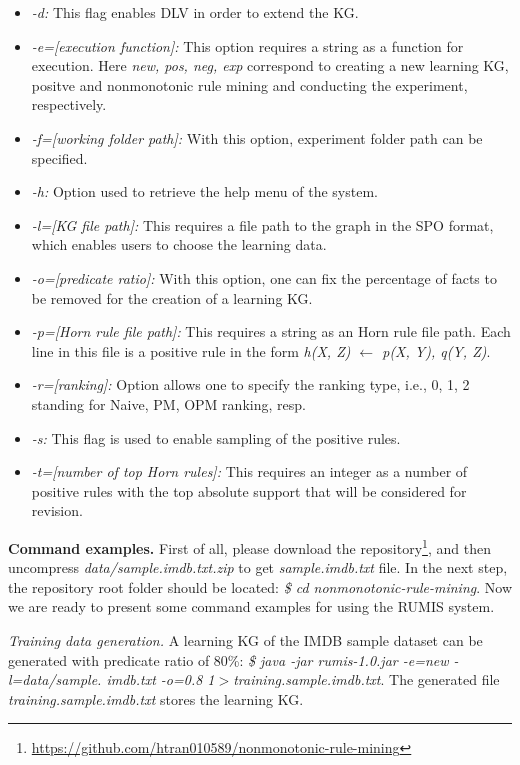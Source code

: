 \begin{itemize}
\item \textit{-d:} This flag enables DLV in order to extend the KG.
\item \textit{-e=[execution function]:} This option requires a string as a function for execution. Here \textit{new, pos, neg, exp} correspond to creating a new learning KG, positve and nonmonotonic rule mining and conducting the experiment, respectively.
\item \textit{-f=[working folder path]:} With this option, experiment folder path can be specified.
\item \textit{-h:} Option used to retrieve the help menu of the system.
\item \textit{-l=[KG file path]:} This requires a file path to the graph in the SPO format, which enables users to choose the learning data.
\item \textit{-o=[predicate ratio]:} With this option, one can fix the percentage of facts to be removed for the creation of a learning KG.
\item \textit{-p=[Horn rule file path]:} This requires a string as an Horn rule file path. Each line in this file is a positive rule in the form \textit{h(X, Z) $\leftarrow$ p(X, Y), q(Y, Z)}.
\item \textit{-r=[ranking]:} Option allows one to specify the ranking type, i.e., 0, 1, 2 standing for Naive, PM, OPM ranking, resp.
\item \textit{-s:} This flag is used to enable sampling of the positive rules.
\item \textit{-t=[number of top Horn rules]:} This requires an integer as a number of positive rules with the top absolute support that will be considered for revision.
\end{itemize}

\textbf{Command examples.} First of all, please download the repository\footnote{\url{https://github.com/htran010589/nonmonotonic-rule-mining}}, and then uncompress \textit{data/sample.imdb.txt.zip} to get \textit{sample.imdb.txt} file. In the next step, the repository root folder should be located: \textit{\$ cd nonmonotonic-rule-mining}. Now we are ready to present some command examples for using the RUMIS system.

\textit{Training data generation.} A learning KG of the IMDB sample dataset can be generated with predicate ratio of 80\%: \textit{\$ java -jar rumis-1.0.jar -e=new -l=data/sample. imdb.txt -o=0.8 1$>$training.sample.imdb.txt}. The generated file \textit{training.sample.imdb.txt} stores the learning KG.

